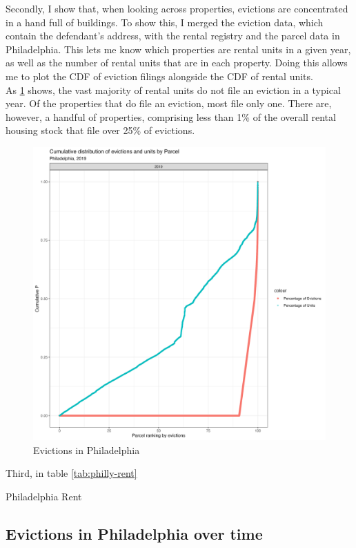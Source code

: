 \documentclass{article}
\begin{document}
Secondly, I show that, when looking across properties, evictions are concentrated in a hand full of buildings. To show this, I merged the eviction data, which contain the defendant's address, with the rental registry and the parcel data in Philadelphia. This lets me know which properties are rental units in a given year, as well as the number of rental units that are in each property. Doing this allows me to plot the CDF of eviction filings alongside the CDF of rental units. \\

As \ref{fig:philly-evict-parcel} shows, the vast majority of rental units do not file an eviction in a typical year. Of the properties that do file an eviction, most file only one. There are, however, a handful of properties, comprising less than 1\% of the overall rental housing stock that file over 25\% of evictions. 

\begin{figure}[htbp]
    \centering
    \includegraphics[width=0.6\linewidth]{figs/cumulative_evict_dist_parcels.png}
    \caption{Evictions in Philadelphia}
    \label{fig:philly-evict-parcel}
\end{figure}

Third, in table \ref{tab:philly-rent}

\begin{table}[htbp]
    
    \caption{Philadelphia Rent}
    \label{tab:philly-rent}
\end{table}


\subsection{Evictions in Philadelphia over time}
\end{document}
